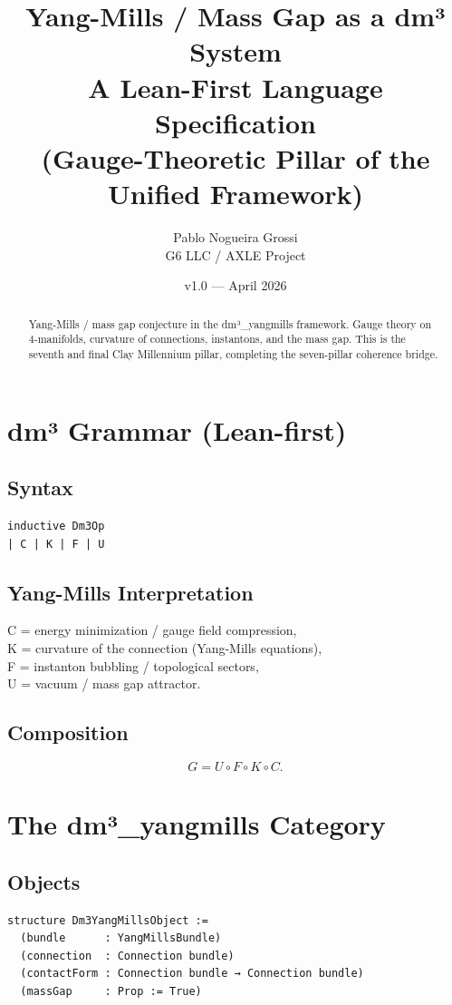 \documentclass[11pt,a4paper]{article}
\title{\textbf{Yang-Mills / Mass Gap as a dm³ System}\\
A Lean-First Language Specification \\
(Gauge-Theoretic Pillar of the Unified Framework)}
\author{Pablo Nogueira Grossi \\ G6 LLC / AXLE Project}
\date{v1.0 — April 2026}
\begin{document}
\maketitle

\begin{abstract}
Yang-Mills / mass gap conjecture in the dm³\_yangmills framework.
Gauge theory on 4-manifolds, curvature of connections, instantons, and the mass gap.
This is the seventh and final Clay Millennium pillar, completing the seven-pillar coherence bridge.
\end{abstract}

\section{dm³ Grammar (Lean-first)}

\subsection{Syntax}
\begin{lstlisting}
inductive Dm3Op
| C | K | F | U
\end{lstlisting}

\subsection{Yang-Mills Interpretation}
C = energy minimization / gauge field compression, \\
K = curvature of the connection (Yang-Mills equations), \\
F = instanton bubbling / topological sectors, \\
U = vacuum / mass gap attractor.

\subsection{Composition}
\[
G = U \circ F \circ K \circ C.
\]

\section{The dm³\_yangmills Category}

\subsection{Objects}
\begin{lstlisting}
structure Dm3YangMillsObject :=
  (bundle      : YangMillsBundle)
  (connection  : Connection bundle)
  (contactForm : Connection bundle → Connection bundle)
  (massGap     : Prop := True)
\end{lstlisting}
\end{document}
